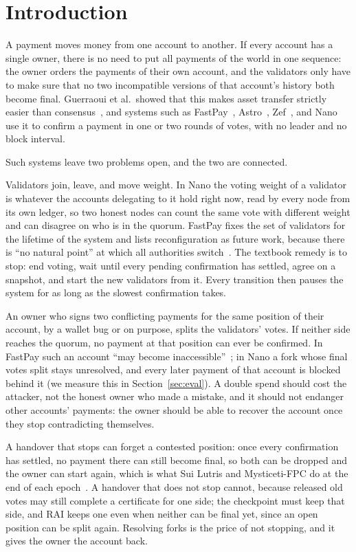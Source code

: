\section{Introduction}
\label{sec:intro}
A payment moves money from one account to another. If every account has a single owner, there is no need to put all payments of the world in one sequence: the owner orders the payments of their own account, and the validators only have to make sure that no two incompatible versions of that account's history both become final. Guerraoui et al.\ showed that this makes asset transfer strictly easier than consensus~\cite{consensusnumber}, and systems such as FastPay~\cite{fastpay}, Astro~\cite{astro}, Zef~\cite{zef}, and Nano~\cite{nano} use it to confirm a payment in one or two rounds of votes, with no leader and no block interval.

Such systems leave two problems open, and the two are connected.

Validators join, leave, and move weight. In Nano the voting weight of a validator is whatever the accounts delegating to it hold right now, read by every node from its own ledger, so two honest nodes can count the same vote with different weight and can disagree on who is in the quorum. FastPay fixes the set of validators for the lifetime of the system and lists reconfiguration as future work, because there is ``no natural point'' at which all authorities switch~\cite{fastpay}. The textbook remedy is to stop: end voting, wait until every pending confirmation has settled, agree on a snapshot, and start the new validators from it. Every transition then pauses the system for as long as the slowest confirmation takes.

An owner who signs two conflicting payments for the same position of their account, by a wallet bug or on purpose, splits the validators' votes. If neither side reaches the quorum, no payment at that position can ever be confirmed. In FastPay such an account ``may become inaccessible''~\cite{fastpay}; in Nano a fork whose final votes split stays unresolved, and every later payment of that account is blocked behind it (we measure this in Section~\ref{sec:eval}). A double spend should cost the attacker, not the honest owner who made a mistake, and it should not endanger other accounts' payments: the owner should be able to recover the account once they stop contradicting themselves.

A handover that stops can forget a contested position: once every confirmation has settled, no payment there can still become final, so both can be dropped and the owner can start again, which is what Sui Lutris and Mysticeti-FPC do at the end of each epoch~\cite{lutris,babel2025mysticeti}. A handover that does not stop cannot, because released old votes may still complete a certificate for one side; the checkpoint must keep that side, and RAI keeps one even when neither can be final yet, since an open position can be split again. Resolving forks is the price of not stopping, and it gives the owner the account back.

